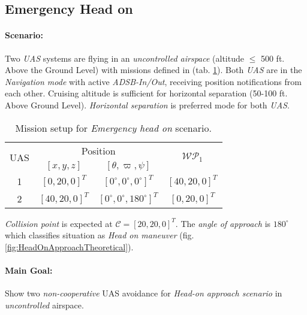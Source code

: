 \subsection{Emergency Head on}\label{s:testEmergencyHeadOn}

\paragraph{Scenario:} Two  \emph{UAS} systems are flying in an \emph{uncontrolled airspace} (altitude $\le$ 500 ft. Above the Ground Level) with missions defined in (tab. \ref{tab:missionSetupEmergencyHeadOnScenario}). Both \emph{UAS} are in the  \emph{Navigation mode} with active \emph{ADSB-In/Out}, receiving position notifications from each other. Cruising altitude is sufficient for horizontal separation (50-100 ft. Above Ground Level). \emph{Horizontal separation} is preferred mode for both \emph{UAS}.


\begin{table}[H]
    \centering
    \begin{tabular}{c||c|c||c}
        \multirow{2}{*}{UAS} &\multicolumn{2}{c||}{Position} & \multirow{2}{*}{$\mathscr{WP}_1$} \\\cline{2-3}
          & $[x,y,z]$           & $[\theta,\varpi,\psi]$           & \\\hline\hline
        1 & $[0,20,0]^T $       & $[0^\circ,0^\circ,0^\circ]^T$    & $[40,20,0]^T$\\\hline 
        2 & $[40,20,0]^T $       & $[0^\circ,0^\circ,180^\circ]^T$  & $[0,20,0]^T$\\ 
    \end{tabular}
    \caption{Mission setup for \emph{Emergency head on} scenario.}
    \label{tab:missionSetupEmergencyHeadOnScenario}
\end{table}


\begin{note}
\emph{Collision point} is expected at $\mathscr{C}=[20,20,0]^T$. The \emph{angle of approach} is $180^{\circ}$  which classifies situation as \emph{Head on maneuver} (fig. \ref{fig:HeadOnApproachTheoretical}).
\end{note}


\paragraph{Main Goal:} Show two \emph{non-cooperative } UAS avoidance for \emph{Head-on approach scenario} in \emph{uncontrolled} airspace.


